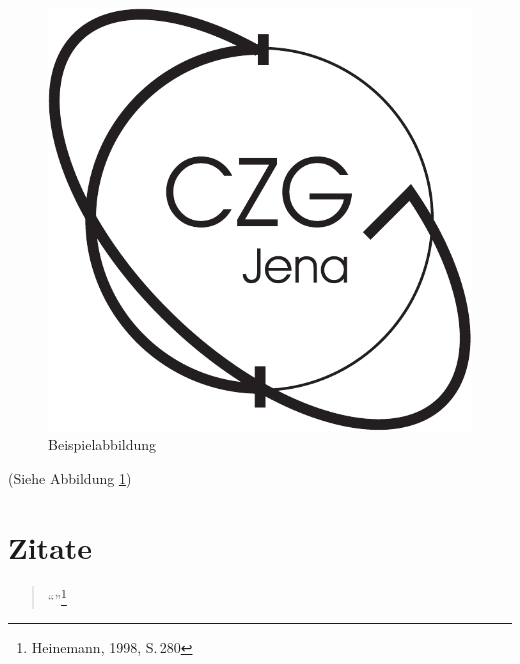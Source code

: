 \begin{figure}[ht]
 \centering
 \includegraphics[scale=.5]{bilder/LogoCZG.pdf}
 \caption{Beispielabbildung}
 \label{abb:beispiel}
\end{figure}

\blindtext(Siehe Abbildung \ref{abb:beispiel})

\section{Zitate}
\begin{quote}
 "`\blindtext"'\footnote{Heinemann, 1998, S.\,280}
\end{quote}
